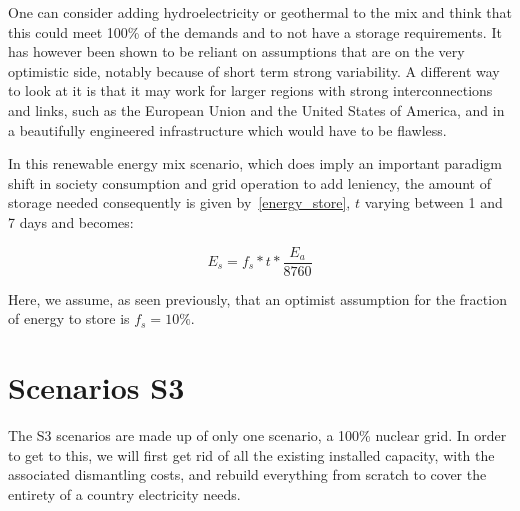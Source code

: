 One can consider adding hydroelectricity or geothermal to the mix and think that this could meet 100\% of the demands and to not have a storage requirements. It has however been shown to be reliant on assumptions that are on the very optimistic side, notably because of short term strong variability. A different way to look at it is that it may work for larger regions with strong interconnections and links, such as the European Union and the United States of America, and in a beautifully engineered infrastructure which would have to be flawless.



\begin{remark}

In this renewable energy mix scenario, which does imply an important paradigm shift in society consumption and grid operation to add leniency, the amount of storage needed consequently is given by~\ref{energy_store}, $t$ varying between 1 and 7 days and becomes:

\begin{equation}\label{energy_store}
E_s = f_s * t * \frac{E_a}{8760}
\end{equation}

Here, we assume, as seen previously, that an optimist assumption for the fraction of energy to store is $f_s = 10\%$.


\end{remark}


\section{Scenarios S3}

The S3 scenarios are made up of only one scenario, a 100\% nuclear grid. In order to get to this, we will first get rid of all the existing installed capacity, with the associated dismantling costs, and rebuild everything from scratch to cover the entirety of a country electricity needs.

